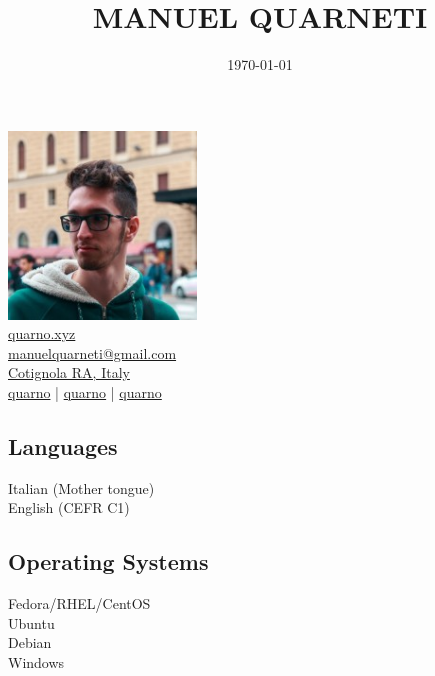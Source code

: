 \documentclass{article}
\title{\HUGE \bfseries MANUEL QUARNETI \\[-20pt]}
\author{}
\date{\today}
\begin{document}
\setmainfont{Inter}

\setlength{\columnsep}{2.2em}
\setlength{\columnseprule}{4pt}
\begin{paracol}{2}

\begin{center}
    \includegraphics[height=5cm]{me} \\[20pt]

    \href{https://quarno.xyz/}{ quarno.xyz} \\[8pt]
    \href{mailto:manuelquarneti@gmail.com}{ manuelquarneti@gmail.com} \\[8pt]
    \href{https://www.openstreetmap.org/relation/43112}{ Cotignola RA, Italy} \\[8pt]
    \href{https://github.com/quarno}{ quarno} \hfill | \hfill
    \href{https://www.linkedin.com/in/quarno}{ quarno} \hfill | \hfill
    \href{https://t.me/quarno}{ quarno} \\[50pt]

    \subsection*{\center Languages}
     Italian (Mother tongue) \\[4pt]
     English (CEFR C1)

    \subsection*{\center Operating Systems}
     Fedora/RHEL/CentOS \\[4pt]
     Ubuntu \\[4pt]
     Debian \\[4pt]
     Windows


\end{center}
\end{paracol}
\end{document}
